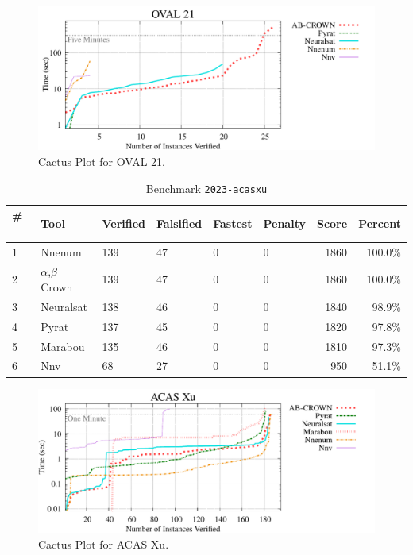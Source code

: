 \begin{figure}[h]
\centerline{\includegraphics[width=\textwidth]{cactus/2022_oval21.pdf}}
\caption{Cactus Plot for OVAL 21.}
\label{fig:quantPic}
\end{figure}



\begin{table}[h]
\begin{center}
\caption{Benchmark \texttt{2023-acasxu}} \label{tab:cat_{cat}}
{\setlength{\tabcolsep}{2pt}
\begin{tabular}[h]{@{}llllllrr@{}}
\toprule
\textbf{\# ~} & \textbf{Tool} & \textbf{Verified} & \textbf{Falsified} & \textbf{Fastest} & \textbf{Penalty} & \textbf{Score} & \textbf{Percent}\\
\midrule
1 & Nnenum & 139 & 47 & 0 & 0 & 1860 & 100.0\% \\
2 & $\alpha$,$\beta$ Crown & 139 & 47 & 0 & 0 & 1860 & 100.0\% \\
3 & Neuralsat & 138 & 46 & 0 & 0 & 1840 & 98.9\% \\
4 & Pyrat & 137 & 45 & 0 & 0 & 1820 & 97.8\% \\
5 & Marabou & 135 & 46 & 0 & 0 & 1810 & 97.3\% \\
6 & Nnv & 68 & 27 & 0 & 0 & 950 & 51.1\% \\
\bottomrule
\end{tabular}
}
\end{center}
\end{table}



\begin{figure}[h]
\centerline{\includegraphics[width=\textwidth]{cactus/2023_acasxu.pdf}}
\caption{Cactus Plot for ACAS Xu.}
\label{fig:quantPic}
\end{figure}


